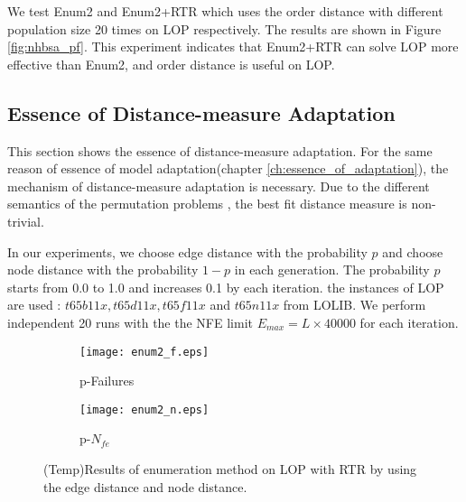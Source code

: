 We test Enum2 and Enum2+RTR which uses the order distance with different population size 20 times on LOP respectively. The results are shown in Figure \ref{fig:nhbsa_pf}. This experiment indicates that Enum2+RTR can solve LOP more effective than Enum2, and order distance is useful on LOP.


\subsection{Essence of Distance-measure Adaptation}
This section shows the essence of distance-measure adaptation. For the same reason of essence of model adaptation(chapter \ref{ch:essence_of_adaptation}), the mechanism of distance-measure adaptation is necessary. Due to the different semantics of the permutation problems , the best fit distance measure is non-trivial.

In our experiments, we choose edge distance with the probability $p$ and choose node distance with the probability $1-p$ in each generation. The probability $p$ starts from 0.0 to 1.0 and increases 0.1 by each iteration. the instances of LOP are used : $t65b11x,t65d11x,t65f11x$ and $t65n11x$ from LOLIB. We perform independent 20 runs with the the NFE limit $E_{max} = L \times 40000$ for each iteration.


\begin{figure}[htbp] 
        \centering
        \begin{subfigure}{0.49\textwidth}
            \texttt{[image: enum2\_f.eps]}
            \caption{p-Failures} 
        \end{subfigure}
        \begin{subfigure}{0.49\textwidth} 
            \texttt{[image: enum2\_n.eps]}
            \caption{p-$N_{fe}$}
        \end{subfigure}

        \caption{(Temp)Results of enumeration method on LOP with RTR by using the edge distance and node distance.  } 
        \label{fig:enum_pf}
\end{figure}

